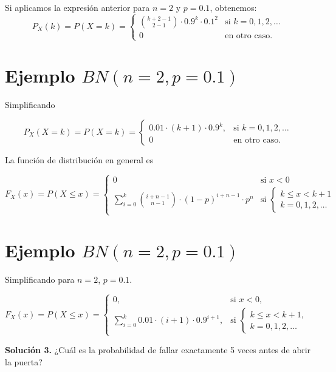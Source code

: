 \documentclass[
  letterpaper,
  DIV=11,
  numbers=noendperiod]{scrreprt}
\begin{document}
Si aplicamos la expresión anterior para \(n=2\) y \(p=0.1\), obtenemos:
\[
P_X(k)=P(X=k)=
\left\{
\begin{array}{cc} 
{k+2-1\choose 2-1} \cdot 0.9^{k}\cdot 0.1^2 & \mbox{si }  k=0,1,2,\ldots \\ 0 & \mbox{en otro caso.}\end{array}\right.
\]

\section{\texorpdfstring{Ejemplo
\(BN(n=2,p=0.1)\)}{Ejemplo BN(n=2,p=0.1)}}\label{ejemplo-bnn2p0.1-1}

Simplificando

\[
P_X(X=k)=P(X=k)=
\left\{
\begin{array}{cc} 
0.01\cdot (k+1)\cdot 0.9^{k}, & \mbox{si }  k=0,1,2,\ldots \\ 0 & \mbox{en otro caso.}\end{array}\right.
\]

La función de distribución en general es

\[
F_X(x)=P(X\leq x)=
\left\{
\begin{array}{ll}
0 & \mbox{si } x<0 \\
\displaystyle\sum_{i=0}^{k }{i+n-1\choose n-1} \cdot (1-p)^{i+n-1}\cdot p^n 
& \mbox{si }\left\{\begin{array}{l} k\leq x< k+1\\k=0,1,2,\ldots\end{array}\right. 
\end{array}
\right.
\]

\section{\texorpdfstring{Ejemplo
\(BN(n=2,p=0.1)\)}{Ejemplo BN(n=2,p=0.1)}}\label{ejemplo-bnn2p0.1-2}

Simplificando para \(n=2\), \(p=0.1\).

\[
F_X(x)=P(X\leq x)=
\left\{
\begin{array}{ll}
0, & \mbox{si } x<0, \\
\displaystyle\sum_{i=0}^{k }0.01\cdot (i+1) \cdot 0.9^{i+1},
& \mbox{si }\left\{\begin{array}{l} k\leq x< k+1,\\k=0,1,2,\ldots\end{array}\right. 
\end{array}
\right.
\]

\textbf{Solución 3.} ¿Cuál es la probabilidad de fallar exactamente 5
veces antes de abrir la puerta?
\end{document}
